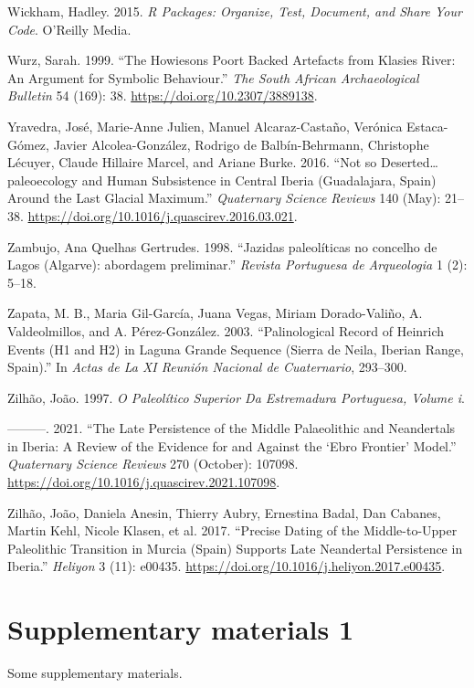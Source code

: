 \documentclass[
  a4paper,
  DIV=11,
  numbers=noendperiod]{scrreprt}
\newlength{\cslhangindent}
\newenvironment{CSLReferences}[2] %
 {\begin{list}{}{%
  \setlength{\itemindent}{0pt}
  \setlength{\leftmargin}{0pt}
  \setlength{\parsep}{0pt}
  \ifodd #1
   \setlength{\leftmargin}{\cslhangindent}
   \setlength{\itemindent}{-1\cslhangindent}
  \fi
  \setlength{\itemsep}{#2\baselineskip}}}
 {\end{list}}
\begin{document}
\begin{CSLReferences}{1}{0}
Wickham, Hadley. 2015. \emph{R {Packages}: {Organize}, {Test},
{Document}, and {Share Your Code}}. O'Reilly Media.

Wurz, Sarah. 1999. {``The Howiesons Poort Backed Artefacts from Klasies
River: An Argument for Symbolic Behaviour.''} \emph{The South African
Archaeological Bulletin} 54 (169): 38.
\url{https://doi.org/10.2307/3889138}.

Yravedra, José, Marie-Anne Julien, Manuel Alcaraz-Castaño, Verónica
Estaca-Gómez, Javier Alcolea-González, Rodrigo de Balbín-Behrmann,
Christophe Lécuyer, Claude Hillaire Marcel, and Ariane Burke. 2016.
{``Not so Deserted{\ldots{}}paleoecology and Human Subsistence in
{Central Iberia} ({Guadalajara}, {Spain}) Around the {Last Glacial
Maximum}.''} \emph{Quaternary Science Reviews} 140 (May): 21--38.
\url{https://doi.org/10.1016/j.quascirev.2016.03.021}.

Zambujo, Ana Quelhas Gertrudes. 1998. {``{Jazidas paleol{í}ticas no
concelho de Lagos (Algarve): abordagem preliminar}.''} \emph{Revista
Portuguesa de Arqueologia} 1 (2): 5--18.

Zapata, M. B., Maria Gil-García, Juana Vegas, Miriam Dorado-Valiño, A.
Valdeolmillos, and A. Pérez-González. 2003. {``Palinological Record of
Heinrich Events (H1 and H2) in Laguna Grande Sequence (Sierra de Neila,
Iberian Range, Spain).''} In \emph{Actas de La XI Reunión Nacional de
Cuaternario}, 293--300.

Zilhão, João. 1997. \emph{O Paleolítico Superior Da Estremadura
Portuguesa, Volume i}.

---------. 2021. {``The Late Persistence of the {Middle Palaeolithic}
and {Neandertals} in {Iberia}: {A} Review of the Evidence for and
Against the {`{Ebro Frontier}'} Model.''} \emph{Quaternary Science
Reviews} 270 (October): 107098.
\url{https://doi.org/10.1016/j.quascirev.2021.107098}.

Zilhão, João, Daniela Anesin, Thierry Aubry, Ernestina Badal, Dan
Cabanes, Martin Kehl, Nicole Klasen, et al. 2017. {``Precise Dating of
the {Middle-to-Upper Paleolithic} Transition in {Murcia} ({Spain})
Supports Late {Neandertal} Persistence in {Iberia}.''} \emph{Heliyon} 3
(11): e00435. \url{https://doi.org/10.1016/j.heliyon.2017.e00435}.

\end{CSLReferences}

\cleardoublepage
{}
{}
\appendix

\chapter{Supplementary materials 1}\label{supplementary-materials-1}

Some supplementary materials.
\end{document}
